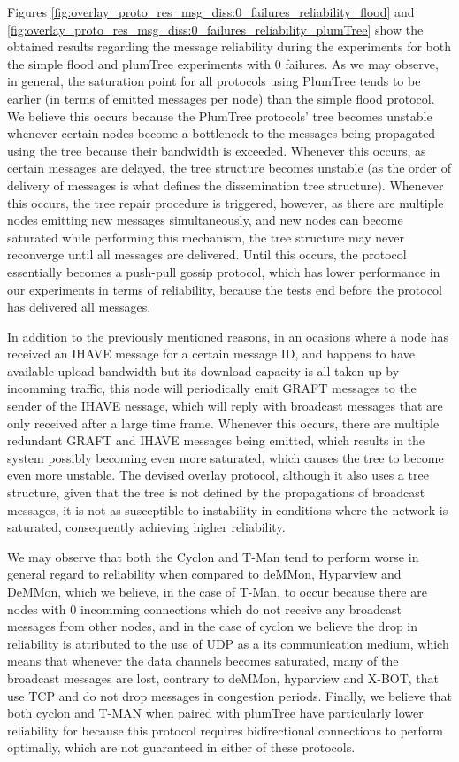Figures \ref{fig:overlay_proto_res_msg_diss:0_failures_reliability_flood} and \ref{fig:overlay_proto_res_msg_diss:0_failures_reliability_plumTree} show the obtained results regarding the message reliability during the experiments for both the simple flood and plumTree experiments with 0 failures. As we may observe, in general, the saturation point for all protocols using PlumTree tends to be earlier (in terms of emitted messages per node) than the simple flood protocol. We believe this occurs because the PlumTree protocols' tree becomes unstable whenever certain nodes become a bottleneck to the messages being propagated using the tree because their bandwidth is exceeded. Whenever this occurs, as certain messages are delayed, the tree structure becomes unstable (as the order of delivery of messages is what defines the dissemination tree structure). Whenever this occurs, the tree repair procedure is triggered, however, as there are multiple nodes emitting new messages simultaneously, and new nodes can become saturated while performing this mechanism, the tree structure may never reconverge until all messages are delivered. Until this occurs, the protocol essentially becomes a push-pull gossip protocol, which has lower performance in our experiments in terms of reliability, because the tests end before the protocol has delivered all messages.

In addition to the previously mentioned reasons, in an ocasions where a node has received an IHAVE message for a certain message ID, and happens to have available upload bandwidth but its download capacity is all taken up by incomming traffic, this node will periodically emit GRAFT messages to the sender of the IHAVE nessage, which will reply with broadcast messages that are only received after a large time frame. Whenever this occurs, there are multiple redundant GRAFT and IHAVE messages being emitted, which results in the system possibly becoming even more saturated, which causes the tree to become even more unstable. The devised overlay protocol, although it also uses a tree structure, given that the tree is not defined by the propagations of broadcast messages, it is not as susceptible to instability in conditions where the network is saturated, consequently achieving higher reliability. 

We may observe that both the Cyclon and T-Man tend to perform worse in general regard to reliability when compared to deMMon, Hyparview and DeMMon, which we believe, in the case of T-Man, to occur because there are nodes with 0 incomming connections which do not receive any broadcast messages from other nodes, and in the case of cyclon we believe the drop in reliability is attributed to the use of UDP as a its communication medium, which means that whenever the data channels becomes saturated, many of the broadcast messages are lost, contrary to deMMon, hyparview and X-BOT, that use TCP and do not drop messages in congestion periods. Finally, we believe that both cyclon and T-MAN when paired with plumTree have particularly lower reliability for because this protocol requires bidirectional connections to perform optimally, which are not guaranteed in either of these protocols. 

